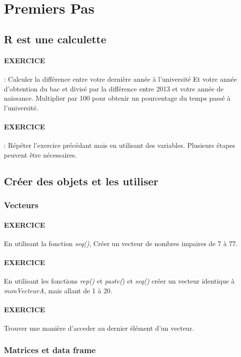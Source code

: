 \section{Premiers Pas}
\subsection{R est une calculette}


\paragraph{EXERCICE} : 
 Calculer la différence entre votre dernière année à l'université
 Et votre année d'obtention du bac et divisé par la différence entre 2013 et votre
 année de naissance. Multiplier par 100 pour obtenir un pourcentage du temps passé 
 à l'université.

\paragraph{EXERCICE} : 
Répéter l'exercice précédant mais en utilisant des variables. Plusieurs étapes peuvent être nécessaires.
\subsection{Créer des objets et les utiliser}
\subsubsection{Vecteurs}

\paragraph{EXERCICE} En utilisant la fonction \emph{seq()}, Créer un vecteur de nombres impaires de 7 à 77. 

\paragraph{EXERCICE} En utilisant les fonctions \emph{rep()} et \emph{paste(}) et \emph{seq()} créer un vecteur identique à \emph{monVecteurA}, mais allant de 1 à 20.

\paragraph{EXERCICE} Trouver une manière d'acceder au dernier élément d'un vecteur.

\subsubsection{Matrices et data frame}

